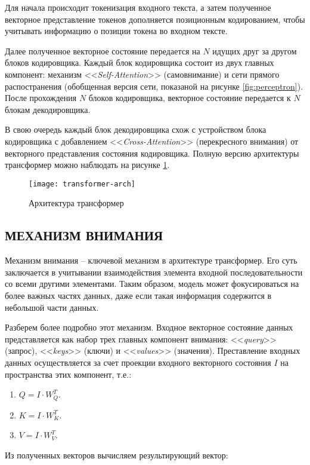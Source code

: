 Для начала происходит токенизация входного текста, а затем полученное векторное представление токенов дополняется позиционным кодированием, чтобы учитывать информацию о позиции токена во входном тексте.

Далее полученное векторное состояние передается на $N$ идущих друг за другом блоков кодировщика. Каждый блок кодировщика состоит из двух главных компонент: механизм <<\textit{Self-Attention}>> (самовнимание) и сети прямого распостранения (обобщенная версия сети, показаной на рисунке \ref{fig:perceptron}). После прохождения $N$ блоков кодировщика, векторное состояние передается к $N$ блокам декодировщика.

В свою очередь каждый блок декодировщика схож с устройством блока кодировщика с добавлением <<\textit{Cross-Attention}>> (перекресного внимания) от векторного представления состояния кодировщика. Полную версию архитектуры трансформер можно наблюдать на рисунке \ref{fig:transformer-arch}.
\begin{figure}[H]
    \centering
    \texttt{[image: transformer-arch]}
    \caption{Архитектура трансформер}
    \label{fig:transformer-arch}
\end{figure}
\subsection{МЕХАНИЗМ ВНИМАНИЯ}
Механизм внимания -- ключевой механизм в архитектуре трансформер. Его суть заключается в учитывании взаимодействия элемента входной последовательности со всеми другими элементами. Таким образом, модель может фокусироваться на более важных частях данных, даже если такая информация содержится в небольшой части данных.

Разберем более подробно этот механизм. Входное векторное состояние данных представляется как набор трех главных компонент внимания: <<\textit{query}>> (запрос), <<\textit{keys}>> (ключи) и <<\textit{values}>> (значения). Преставление входных данных осуществляется за счет проекции входного векторного состояния $I$ на пространства этих компонент, т.е.:

\begin{enumerate}
    \item $Q = I \cdot W_Q^T$.
    \item $K = I \cdot W_K^T$.
    \item $V = I \cdot W_V^T$.
\end{enumerate}

Из полученных векторов вычисляем результирующий вектор:

